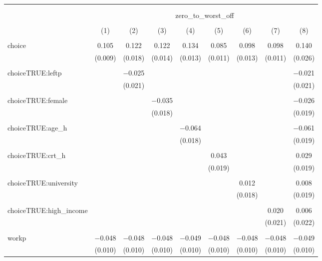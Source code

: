 
\begin{table}[!htbp] \centering 
  \caption{} 
  \label{} 
\begin{tabular}{@{\extracolsep{5pt}}lcccccccc} 
\\[-1.8ex]\hline 
\hline \\[-1.8ex] 
\\[-1.8ex] & \multicolumn{8}{c}{zero\_to\_worst\_off} \\ 
\\[-1.8ex] & (1) & (2) & (3) & (4) & (5) & (6) & (7) & (8)\\ 
\hline \\[-1.8ex] 
 choice & 0.105 & 0.122 & 0.122 & 0.134 & 0.085 & 0.098 & 0.098 & 0.140 \\ 
  & (0.009) & (0.018) & (0.014) & (0.013) & (0.011) & (0.013) & (0.011) & (0.026) \\ 
  & & & & & & & & \\ 
 choiceTRUE:leftp &  & $-$0.025 &  &  &  &  &  & $-$0.021 \\ 
  &  & (0.021) &  &  &  &  &  & (0.021) \\ 
  & & & & & & & & \\ 
 choiceTRUE:female &  &  & $-$0.035 &  &  &  &  & $-$0.026 \\ 
  &  &  & (0.018) &  &  &  &  & (0.019) \\ 
  & & & & & & & & \\ 
 choiceTRUE:age\_h &  &  &  & $-$0.064 &  &  &  & $-$0.061 \\ 
  &  &  &  & (0.018) &  &  &  & (0.019) \\ 
  & & & & & & & & \\ 
 choiceTRUE:crt\_h &  &  &  &  & 0.043 &  &  & 0.029 \\ 
  &  &  &  &  & (0.019) &  &  & (0.019) \\ 
  & & & & & & & & \\ 
 choiceTRUE:university &  &  &  &  &  & 0.012 &  & 0.008 \\ 
  &  &  &  &  &  & (0.018) &  & (0.019) \\ 
  & & & & & & & & \\ 
 choiceTRUE:high\_income &  &  &  &  &  &  & 0.020 & 0.006 \\ 
  &  &  &  &  &  &  & (0.021) & (0.022) \\ 
  & & & & & & & & \\ 
 workp & $-$0.048 & $-$0.048 & $-$0.048 & $-$0.049 & $-$0.048 & $-$0.048 & $-$0.048 & $-$0.049 \\ 
  & (0.010) & (0.010) & (0.010) & (0.010) & (0.010) & (0.010) & (0.010) & (0.010) \\ 

\end{tabular}
\end{table}
